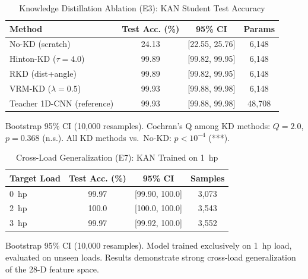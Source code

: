 \documentclass[journal,onecolumn]{IEEEtran}
\begin{document}
\begin{table}[t]
\centering
\caption{Knowledge Distillation Ablation (E3): KAN Student Test Accuracy}
\label{tab:kd_ablation}
\begin{tabular}{lccc}
\toprule
\textbf{Method} & \textbf{Test Acc. (\%)} & \textbf{95\% CI} & \textbf{Params} \\
\midrule
No-KD (scratch)               & 24.13  & [22.55, 25.76] & 6,148 \\
Hinton-KD ($\tau{=}4.0$)      & 99.89  & [99.82, 99.95] & 6,148 \\
RKD (dist+angle)              & 99.89  & [99.82, 99.95] & 6,148 \\
VRM-KD ($\lambda{=}0.5$)      & 99.93  & [99.88, 99.98] & 6,148 \\
\midrule
Teacher 1D-CNN (reference)    & 99.93  & [99.88, 99.98] & 48,708 \\
\bottomrule
\end{tabular}
\vspace{1pt}
{\scriptsize Bootstrap 95\% CI (10,000 resamples). Cochran's Q among KD methods:
$Q=2.0$, $p=0.368$ (n.s.). All KD methods vs.\ No-KD: $p < 10^{-4}$ (***).}
\end{table}

\begin{table}[t]
\centering
\caption{Cross-Load Generalization (E7): KAN Trained on 1~hp}
\label{tab:cross_load}
\begin{tabular}{lccc}
\toprule
\textbf{Target Load} & \textbf{Test Acc. (\%)} & \textbf{95\% CI} & \textbf{Samples} \\
\midrule
0~hp & 99.97 & [99.90, 100.0] & 3,073 \\
2~hp & 100.0 & [100.0, 100.0] & 3,543 \\
3~hp & 99.97 & [99.92, 100.0] & 3,552 \\
\bottomrule
\end{tabular}
\vspace{1pt}
{\scriptsize Bootstrap 95\% CI (10,000 resamples). Model trained exclusively on
1~hp load, evaluated on unseen loads. Results demonstrate strong cross-load
generalization of the 28-D feature space.}
\end{table}
\end{document}
